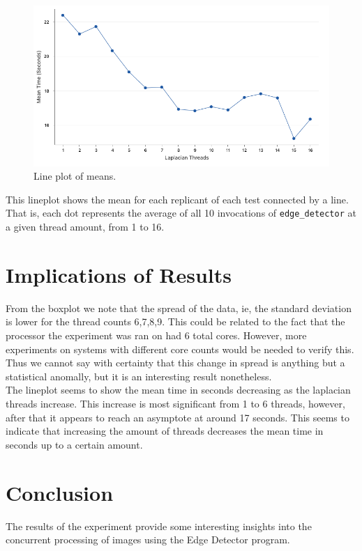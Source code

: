 \documentclass{article}
\begin{document}
\clearpage
\begin{figure}[h]
  \centering
  \includegraphics[width=1\textwidth]{./images/1.png}
  \caption{Line plot of means.}
  \label{fig:3_b_2}
\end{figure}
This lineplot shows the mean for each replicant of each test connected by a line.
That is, each dot represents the average of all 10 invocations of
\texttt{edge\_detector} at a given thread amount, from 1 to 16.

\section*{Implications of Results}
From the boxplot we note that the spread of the data,
ie, the standard deviation is lower for the thread counts 6,7,8,9.
This could be related to the fact that the processor the experiment was
ran on had 6 total cores.
However, more experiments on systems with different core counts
would be needed to verify this.
Thus we cannot say with certainty that this change in spread
is anything but a statistical anomally,
but it is an interesting result nonetheless. \\

The lineplot seems to show the mean time in seconds decreasing
as the laplacian threads increase. This increase is most significant
from 1 to 6 threads, however, after that it appears to reach an
asymptote at around 17 seconds. This seems to indicate that increasing
the amount of threads decreases the mean time in seconds up to a certain amount.
\section*{Conclusion}
The results of the experiment provide some interesting insights into the
concurrent processing of images using the Edge Detector program. \\
\end{document}
